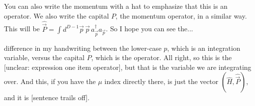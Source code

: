 

You can also write the momentum with a hat to emphasize that this is an operator. We also write the capital \(P\), the momentum operator, in a similar way. This will be \(\widehat{\vec P}=\int d^{D-1}\vec p\,\vec p\,a_{\vec p}^{\dagger}a_{\vec p}\). So I hope you can see the...


difference in my handwriting between the lower-case \(p\), which is an integration variable, versus the capital \(P\), which is the operator. All right, so this is the [unclear: expression one item operator], but that is the variable we are integrating over. And this, if you have the \(\mu\) index directly there, is just the vector \((\widehat H,\widehat{\vec P})\), and it is [sentence trails off].


